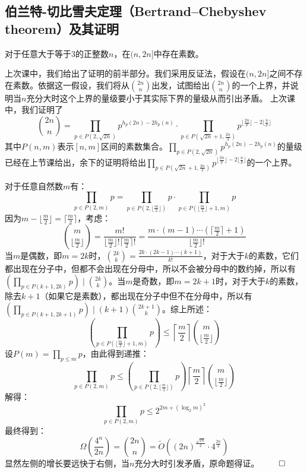 ﻿\documentclass[11pt]{article}
\newtheorem{theorem}{{\hskip 1.7em \bf 定理}}
\renewenvironment{proof}{{\noindent\hskip 2em \bf 证明 \quad}}{\hfill$\qed$\par}
\begin{document}
    \subsection{伯兰特-切比雪夫定理（Bertrand–Chebyshev theorem）及其证明}
    \begin{theorem}
       对于任意大于等于$3$的正整数$n$，在$(n,2n]$中存在素数。
    \end{theorem}
    \begin{proof}
        上次课中，我们给出了证明的前半部分。我们采用反证法，假设在$(n,2n]$之间不存在素数。依据这一假设，我们将从$\binom{2n}{n}$出发，试图给出$\binom{2n}{n}$的一个上界，并说明当$n$充分大时这个上界的量级要小于其实际下界的量级从而引出矛盾。
        上次课中，我们证明了
         \[
            \binom{2n}{n}=\prod_{p\in P(2,\sqrt{2n})}p^{h_p(2n)-2h_p(n)}\cdot \prod_{p\in P(\sqrt{2n}+1,\frac{2n}{3})}p^{\lfloor\frac{2n}{p}\rfloor-2\lfloor\frac{n}{p}\rfloor}
         \]
        其中$P(n,m)$表示$[n,m]$区间的素数集合。$\prod_{p\in P(2,\sqrt{2n})}p^{h_p(2n)-2h_p(n)}$的量级已经在上节课给出，余下的证明将给出$\prod_{p\in P(\sqrt{2n}+1,\frac{2n}{3})}p^{\lfloor\frac{2n}{p}\rfloor-2\lfloor\frac{n}{p}\rfloor}$的一个上界。

        对于任意自然数$m$有：
        \[
            \prod_{p\in P(2,m)}p=\prod_{p\in P(2,\lfloor\frac{m}{2}\rfloor)}p \cdot \prod_{p\in P(\lfloor\frac{m}{2}\rfloor+1,m)}p
        \]
        因为$m-\lfloor\frac{m}{2}\rfloor=\lceil\frac{m}{2}\rceil$，考虑：
        \[
            \binom{m}{\lfloor\frac{m}{2}\rfloor}=\frac{m!}{\lfloor\frac{m}{2}\rfloor!\lceil\frac{m}{2}\rceil!}=\frac{m\cdot(m-1)\cdots(\lceil\frac{m}{2}\rceil+1)}{\lfloor\frac{m}{2}\rfloor!}
        \]
        当$m$是偶数，即$m=2k$时，$\binom{2k}{k}=\frac{2k\cdot(2k-1)\cdots(k+1)}{k!}$，对于大于$k$的素数，它们都出现在分子中，但都不会出现在分母中，所以不会被分母中的数约掉，所以有$\left(\prod_{p\in P(k+1,2k)}p\right)\mid \binom{2k}{k}$。当$m$是奇数，即$m=2k+1$时，对于大于$k$的素数，除去$k+1$（如果它是素数），都出现在分子中但不在分母中，所以有$\left(\prod_{p\in P(k+1,2k+1)}p\right)\mid (k+1)\binom{2k+1}{k}$。综上所述：
        \[\left(\prod_{p\in P(\lfloor\frac{m}{2}\rfloor+1,m)}p\right)\leq \left\lceil\frac{m}{2}\right\rceil\binom{m}{\lfloor\frac{m}{2}\rfloor}\]
        设$P(m)=\prod_{p\leq m}p$，由此得到递推：
        \[\prod_{p\in P(2,m)}p\leq \left(\prod_{p\in P(2,\lfloor\frac{m}{2}\rfloor)}p\right)\left\lceil\frac{m}{2}\right\rceil\binom{m}{\lfloor\frac{m}{2}\rfloor}\]
        解得：
        \[
            \prod_{p\in P(2,m)}p\leq 2^{2m+(\log_2 m)^2}
        \]
        最终得到：
        \[
            \Omega\left(\frac{4^n}{2n}\right)=\binom{2n}{n}=\tilde O\left((2n)^{\frac{\sqrt{2n}}{2}}\cdot {4}^{\frac{2n}{3}}\right)
        \]
        显然左侧的增长要远快于右侧，当$n$充分大时引发矛盾，原命题得证。
      \end{proof}
\end{document}
